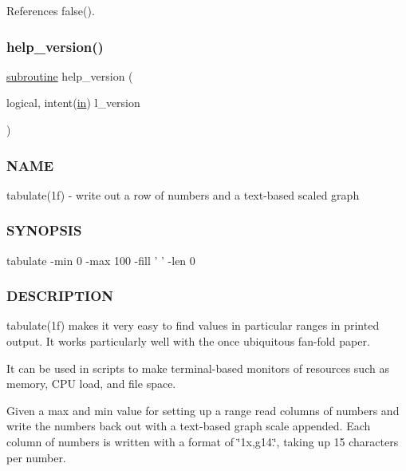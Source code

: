 References false().

\mbox{\label{tabulate_8f90_a39c21619b08a3c22f19e2306efd7f766}} 
\subsubsection{\texorpdfstring{help\+\_\+version()}{help\_version()}}
{\footnotesize\ttfamily \hyperlink{M__stopwatch_83_8txt_acfbcff50169d691ff02d4a123ed70482}{subroutine} help\+\_\+version (\begin{DoxyParamCaption}\item[{logical, intent(\hyperlink{M__journal_83_8txt_afce72651d1eed785a2132bee863b2f38}{in})}]{l\+\_\+version }\end{DoxyParamCaption})}



\subsubsection*{N\+A\+ME}

tabulate(1f) -\/ write out a row of numbers and a text-\/based scaled graph 

\subsubsection*{S\+Y\+N\+O\+P\+S\+IS}

\begin{DoxyVerb}  tabulate -min 0 -max 100 -fill ' ' -len 0
\end{DoxyVerb}


\subsubsection*{D\+E\+S\+C\+R\+I\+P\+T\+I\+ON}

tabulate(1f) makes it very easy to find values in particular ranges in printed output. It works particularly well with the once ubiquitous fan-\/fold paper.

It can be used in scripts to make terminal-\/based monitors of resources such as memory, C\+PU load, and file space.

Given a max and min value for setting up a range read columns of numbers and write the numbers back out with a text-\/based graph scale appended. Each column of numbers is written with a format of \char`\"{}1x,g14.\char`\"{}, taking up 15 characters per number.

